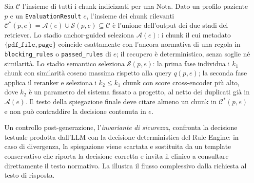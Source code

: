 \begin{definition}
\label{def:chunk-rilevanti}
Sia $\mathcal{C}$ l'insieme di tutti i chunk indicizzati per una Nota.
Dato un profilo paziente $p$ e un \texttt{EvaluationResult} $e$,
l'insieme dei chunk rilevanti $\mathcal{C}^*(p, e) = \mathcal{A}(e) \cup \mathcal{S}(p, e)
\subseteq \mathcal{C}$ è l'unione dell'output dei due stadi del retriever.
Lo stadio anchor-guided seleziona $\mathcal{A}(e)$: i chunk il cui metadato
$\{\texttt{pdf\_file}, \texttt{page}\}$ coincide esattamente con l'ancora
normativa di una regola in \texttt{blocking\_rules} o \texttt{passed\_rules}
di $e$; il recupero è deterministico, senza soglie né similarità. Lo stadio
semantico seleziona $\mathcal{S}(p, e)$: la prima fase individua i $k_1$
chunk con similarità coseno massima rispetto alla query $q(p, e)$;
la seconda fase applica il reranker \reranker{} e seleziona i $k_2 \leq k_1$
chunk con score cross-encoder più alto, dove $k_2$ è un parametro
del sistema fissato a progetto, al netto dei duplicati già in $\mathcal{A}(e)$.
Il testo della spiegazione finale deve citare almeno un chunk in
$\mathcal{C}^*(p, e)$ e non può contraddire la decisione contenuta in $e$.
\end{definition}

Un controllo post-generazione, l'\emph{invariante di sicurezza},
confronta la decisione testuale prodotta dall'LLM con la decisione
deterministica del Rule Engine: in caso di divergenza, la spiegazione
viene scartata e sostituita da un template conservativo che riporta
la decisione corretta e invita il clinico a consultare direttamente
il testo normativo.
La  illustra il flusso complessivo dalla richiesta
al testo di risposta.

